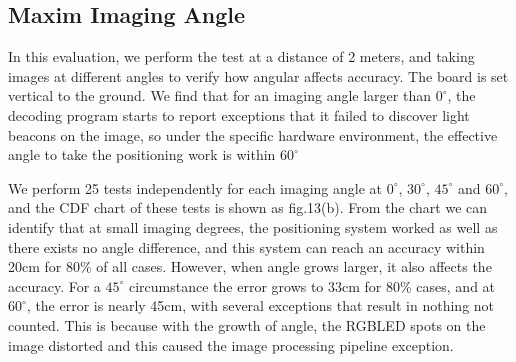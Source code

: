 \documentclass[conference]{IEEEtran}
\begin{document}
\subsection{\textbf{Maxim Imaging Angle}}
In this evaluation, we perform the test at a distance of 2 meters, and taking images at different angles to verify how angular affects accuracy. The board is set vertical to the ground. We find that for an imaging angle larger than $0^{\circ}$, the decoding program starts to report exceptions that it failed to discover light beacons on the image, so under the specific hardware environment, the effective angle to take the positioning work is within $60^{\circ}$

We perform 25 tests independently for each imaging angle at  $0^{\circ}$,  $30^{\circ}$,  $45^{\circ}$ and  $60^{\circ}$, and the CDF chart of these tests is shown as fig.13(b). From the chart we can identify that at small imaging degrees, the positioning system worked as well as there exists no angle difference, and this system can reach an accuracy within 20cm for 80\% of all cases. However, when angle grows larger, it also affects the accuracy. For a $45^{\circ}$ circumstance the error grows to 33cm for 80\% cases, and at $60^{\circ}$, the error is nearly 45cm, with several exceptions that result in nothing not counted. This is because with the growth of angle, the RGBLED spots on the image distorted and this caused the image processing pipeline exception.
\end{document}

